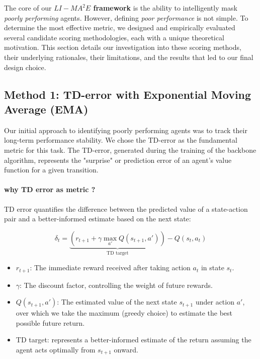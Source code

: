 The core of our \textbf{$LI-{MA}^2E$ framework} is the ability to intelligently mask \textit{poorly performing} agents. However, defining \textit{poor performance} is not simple. To determine the most effective metric, we designed and empirically evaluated several candidate scoring methodologies, each with a unique theoretical motivation. This section details our investigation into these scoring methods, their underlying rationales, their limitations, and the results that led to our final design choice.
\subsection{Method 1: TD-error with Exponential Moving Average (EMA)}
\label{subsec:ema_method}


Our initial approach to identifying poorly performing agents was to track their long-term performance stability. We chose the TD-error as the fundamental metric for this task. The TD-error, generated during the training of the backbone algorithm, represents the "surprise" or prediction error of an agent's value function for a given transition. 

\paragraph{why \ac{TD} error as metric  ?} 
TD error quantifies the difference between the predicted value of a state-action pair and a better-informed estimate based on the next state:

\begin{equation}
    \delta_t = 
    \underbrace{\left(r_{t+1} + \gamma \max_{a'} Q(s_{t+1}, a')\right)}_{\text{TD target}} 
    - Q(s_t, a_t)
    \label{eq:td_error}
\end{equation}

\begin{itemize}
    \item $r_{t+1}$: The immediate reward received after taking action $a_t$ in state $s_t$.
    \item $\gamma$: The discount factor, controlling the weight of future rewards.
    \item $Q(s_{t+1}, a')$: The estimated value of the next state $s_{t+1}$ under action $a'$, over which we take the maximum (greedy choice) to estimate the best possible future return.
    \item TD target: represents a better-informed estimate of the return assuming the agent acts optimally from $s_{t+1}$ onward.

\end{itemize}

